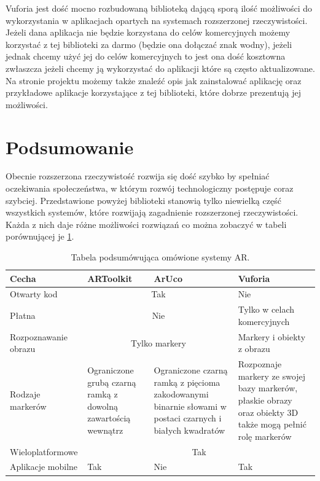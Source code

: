 Vuforia jest dość mocno rozbudowaną biblioteką dającą sporą ilość możliwości do wykorzystania w aplikacjach opartych na systemach rozszerzonej rzeczywistości. Jeżeli dana aplikacja nie będzie korzystana do celów komercyjnych możemy korzystać z tej biblioteki za darmo (będzie ona dołączać znak wodny), jeżeli jednak chcemy użyć jej do celów komercyjnych to jest ona dość kosztowna zwłaszcza jeżeli chcemy ją wykorzystać do aplikacji które są często aktualizowane. Na stronie projektu \cite{Vuforia} możemy także znaleźć opis jak zainstalować aplikację oraz przykładowe aplikacje korzystające z tej biblioteki, które dobrze prezentują jej możliwości.


\section{Podsumowanie}
\label{sec:podsumowanie}

Obecnie rozszerzona rzeczywistość rozwija się dość szybko by spełniać oczekiwania społeczeństwa, w którym rozwój technologiczny postępuje coraz szybciej. Przedstawione powyżej biblioteki stanowią tylko niewielką część wszystkich systemów, które rozwijają zagadnienie rozszerzonej rzeczywistości. Każda z nich daje różne możliwości rozwiązań co można zobaczyć w tabeli porównującej je \ref{tab:tabelaPodsumowania}.

\begin{table}[h!]
	\begin{center}
		\begin{tabular}{| p{35mm} | p{35mm} | p{35mm} | p{35mm} |}
			\hline
			\textbf{Cecha} & \textbf{ARToolkit} & \textbf{ArUco} & \textbf{Vuforia} \\ \hline
			Otwarty kod & \multicolumn{2}{c|}{Tak} & Nie \\ \hline
			Płatna & \multicolumn{2}{c|}{Nie} & Tylko w celach komercyjnych \\ \hline
			Rozpoznawanie obrazu & \multicolumn{2}{c|}{Tylko markery} &  Markery i obiekty z obrazu \\ \hline
			Rodzaje markerów & Ograniczone grubą czarną ramką z dowolną zawartością wewnątrz & Ograniczone czarną ramką z pięcioma zakodowanymi binarnie słowami w postaci czarnych i białych kwadratów & Rozpoznaje markery ze swojej bazy markerów, płaskie obrazy oraz obiekty 3D także mogą pełnić rolę markerów \\ \hline
			Wieloplatformowe & \multicolumn{3}{c|}{Tak} \\ \hline
			Aplikacje mobilne & Tak & Nie & Tak \\
			\hline
		\end{tabular}
		\caption{Tabela podsumówująca omówione systemy AR.} \label{tab:tabelaPodsumowania}
	\end{center}
\end{table}